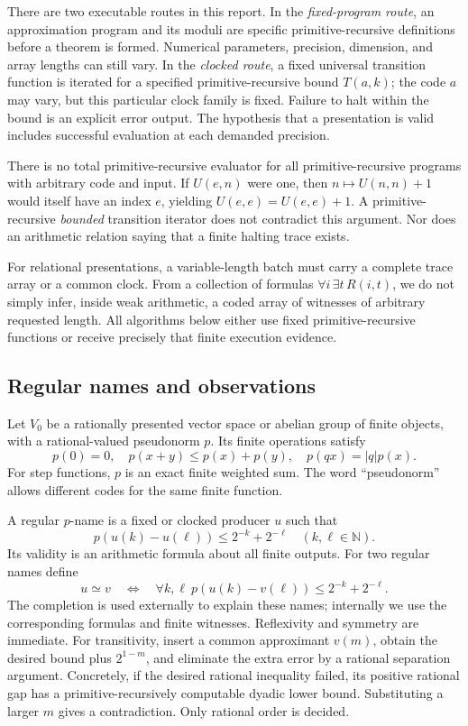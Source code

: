 There are two executable routes in this report.
In the \emph{fixed-program route}, an approximation program and its
moduli are specific primitive-recursive definitions before a theorem is
formed. Numerical parameters, precision, dimension, and array lengths
can still vary. In the \emph{clocked route}, a fixed universal transition
function is iterated for a specified primitive-recursive bound
\(T(a,k)\); the code \(a\) may vary, but this particular clock family is
fixed. Failure to halt within the bound is an explicit error output.
The hypothesis that a presentation is valid includes successful
evaluation at each demanded precision.

There is no total primitive-recursive evaluator for all
primitive-recursive programs with arbitrary code and input. If
\(U(e,n)\) were one, then \(n\mapsto U(n,n)+1\) would itself have an
index \(e\), yielding \(U(e,e)=U(e,e)+1\). A primitive-recursive
\emph{bounded} transition iterator does not contradict this argument.
Nor does an arithmetic relation saying that a finite halting trace exists.

For relational presentations, a variable-length batch must carry a
complete trace array or a common clock. From a collection of formulas
\(\forall i\,\exists t\,R(i,t)\), we do not simply infer, inside weak
arithmetic, a coded array of witnesses of arbitrary requested length.
All algorithms below either use fixed primitive-recursive functions or
receive precisely that finite execution evidence.

\subsection{Regular names and observations}

Let \(V_0\) be a rationally presented vector space or abelian group of
finite objects, with a rational-valued pseudonorm \(p\). Its finite
operations satisfy
\[
 p(0)=0,\quad p(x+y)\leq p(x)+p(y),\quad
 p(qx)=|q|p(x).
\]
For step functions, \(p\) is an exact finite weighted sum. The word
``pseudonorm'' allows different codes for the same finite function.

A regular \(p\)-name is a fixed or clocked producer \(u\) such that
\[
 p(u(k)-u(\ell))\leq 2^{-k}+2^{-\ell}\quad(k,\ell\in\mathbb N).
 \tag{R}\label{eq:regular}
\]
Its validity is an arithmetic formula about all finite outputs. For two
regular names define
\[
 u\simeq v\quad\Longleftrightarrow\quad
 \forall k,\ell\ p(u(k)-v(\ell))\leq2^{-k}+2^{-\ell}.
 \tag{E}\label{eq:equiv}
\]
The completion is used externally to explain these names; internally we
use the corresponding formulas and finite witnesses. Reflexivity and
symmetry are immediate. For transitivity, insert a common approximant
\(v(m)\), obtain the desired bound plus \(2^{1-m}\), and eliminate the
extra error by a rational separation argument. Concretely, if the
desired rational inequality failed, its positive rational gap has a
primitive-recursively computable dyadic lower bound. Substituting a
larger \(m\) gives a contradiction. Only rational order is decided.

